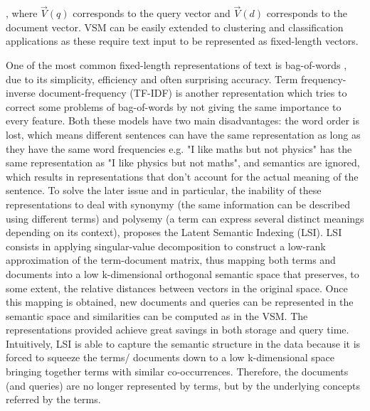 \documentclass[a4paper]{article}
\begin{document}
, where $\overrightarrow{V}(q)$ corresponds to the query vector and $\overrightarrow{V}(d)$ corresponds to the document vector. VSM can be easily extended to clustering and classification applications as these require text input to be represented as fixed-length vectors. 

One of the most common fixed-length representations of text is bag-of-words \citep{harris1954}, due to its simplicity, efficiency and often surprising accuracy. Term frequency-inverse document-frequency (TF-IDF) \citep{jones1972} is another representation which tries to correct some problems of bag-of-words by not giving the same importance to every feature. Both these models have two main disadvantages: the word order is lost, which means different sentences can have the same representation as long as they have the same word frequencies e.g. "I like maths but not physics" has the same representation as "I like physics but not maths", and semantics are ignored, which results in representations that don't account for the actual meaning of the sentence. To solve the later issue and in particular, the inability of these representations to deal with synonymy (the same information can be described using different terms) and polysemy (a term can express several distinct meanings depending on its context), \citet{deerwester1990} proposes the Latent Semantic Indexing (LSI). LSI consists in applying singular-value decomposition to construct a low-rank approximation of the term-document matrix, thus mapping both terms and documents into a low k-dimensional orthogonal semantic space that preserves, to some extent, the relative distances between vectors in the original space. Once this mapping is obtained, new documents and queries can be represented in the semantic space and similarities can be computed as in the VSM. The representations provided achieve great savings in both storage and query time. Intuitively, LSI is able to capture the semantic structure in the data because it is forced to squeeze the terms/ documents down to a low k-dimensional space bringing together terms with similar co-occurrences. Therefore, the documents (and queries) are no longer represented by terms, but by the underlying concepts referred by the terms. 
\end{document}
